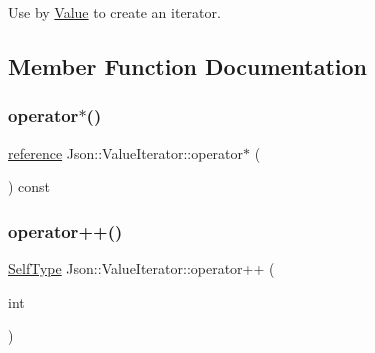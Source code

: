 Use by \hyperlink{classJson_1_1Value}{Value} to create an iterator. 

\subsection{Member Function Documentation}
\mbox{\label{classJson_1_1ValueIterator_a3be48b0c1729ec2532f1ff27ad465d32_a3be48b0c1729ec2532f1ff27ad465d32}} 
\subsubsection{\texorpdfstring{operator$\ast$()}{operator*()}}
{\footnotesize\ttfamily \hyperlink{classJson_1_1ValueIterator_ae87929b4567aa00372cf602c43b57160_ae87929b4567aa00372cf602c43b57160}{reference} Json\+::\+Value\+Iterator\+::operator$\ast$ (\begin{DoxyParamCaption}{ }\end{DoxyParamCaption}) const\hspace{0.3cm}{\ttfamily [inline]}}

\mbox{\label{classJson_1_1ValueIterator_abcf4ddd994a010742cd4a436d65acd08_abcf4ddd994a010742cd4a436d65acd08}} 
\subsubsection{\texorpdfstring{operator++()}{operator++()}\hspace{0.1cm}{\footnotesize\ttfamily [1/2]}}
{\footnotesize\ttfamily \hyperlink{classJson_1_1ValueIteratorBase_a9d2a940d03ea06d20d972f41a89149ee_a9d2a940d03ea06d20d972f41a89149ee}{Self\+Type} Json\+::\+Value\+Iterator\+::operator++ (\begin{DoxyParamCaption}\item[{int}]{ }\end{DoxyParamCaption})\hspace{0.3cm}{\ttfamily [inline]}}

\mbox{\label{classJson_1_1ValueIterator_a92146c46f8249e2b2d12869e70cd4cee_a92146c46f8249e2b2d12869e70cd4cee}} 
